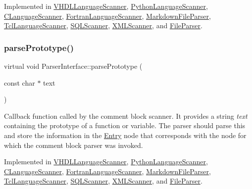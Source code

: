 Implemented in \mbox{\hyperlink{class_v_h_d_l_language_scanner_a604cae09257525fbca32c10ffeb6e961}{V\+H\+D\+L\+Language\+Scanner}}, \mbox{\hyperlink{class_python_language_scanner_a6848c585fe2a19cd36ed34540dc3fdce}{Python\+Language\+Scanner}}, \mbox{\hyperlink{class_c_language_scanner_a0a92c2f77d7b78987e8dad149a2f4171}{C\+Language\+Scanner}}, \mbox{\hyperlink{class_fortran_language_scanner_a6f2e7fa4a4d46ae48289cd135f9f495d}{Fortran\+Language\+Scanner}}, \mbox{\hyperlink{class_markdown_file_parser_a56e4994924ce8ac7710e2a1da0f98807}{Markdown\+File\+Parser}}, \mbox{\hyperlink{class_tcl_language_scanner_a0c1673d0753d4fa415de90aa7d875e0e}{Tcl\+Language\+Scanner}}, \mbox{\hyperlink{class_s_q_l_scanner_ace5de45254ddb10a6282bf626aea6994}{S\+Q\+L\+Scanner}}, \mbox{\hyperlink{class_x_m_l_scanner_ad7b6e344f24e73a8757937a806b5931a}{X\+M\+L\+Scanner}}, and \mbox{\hyperlink{class_file_parser_a129994a05caded4f7bfe5d30945f008b}{File\+Parser}}.

\mbox{\label{class_parser_interface_a5ebf0f524a296845befa22c85a4cc80b}} 
\subsubsection{\texorpdfstring{parsePrototype()}{parsePrototype()}}
{\footnotesize\ttfamily virtual void Parser\+Interface\+::parse\+Prototype (\begin{DoxyParamCaption}\item[{const char $\ast$}]{text }\end{DoxyParamCaption})\hspace{0.3cm}{\ttfamily [pure virtual]}}

Callback function called by the comment block scanner. It provides a string {\itshape text} containing the prototype of a function or variable. The parser should parse this and store the information in the \mbox{\hyperlink{class_entry}{Entry}} node that corresponds with the node for which the comment block parser was invoked. 

Implemented in \mbox{\hyperlink{class_v_h_d_l_language_scanner_a10bbe28441f011a5de49705e1a64db00}{V\+H\+D\+L\+Language\+Scanner}}, \mbox{\hyperlink{class_python_language_scanner_a114cb3ee5e45f0eb07829faa2868e31e}{Python\+Language\+Scanner}}, \mbox{\hyperlink{class_c_language_scanner_afabfbfe6ca101e1d0d02fed9d197cad1}{C\+Language\+Scanner}}, \mbox{\hyperlink{class_fortran_language_scanner_a8ae8487e02f24ee625ad804b9bda78b3}{Fortran\+Language\+Scanner}}, \mbox{\hyperlink{class_markdown_file_parser_a5579fefcfe5512e79abfe55fd508fc95}{Markdown\+File\+Parser}}, \mbox{\hyperlink{class_tcl_language_scanner_ad39889d754478f3bd641c92c3fdb2247}{Tcl\+Language\+Scanner}}, \mbox{\hyperlink{class_s_q_l_scanner_ae86c2ea0733df595918fad083095e5b1}{S\+Q\+L\+Scanner}}, \mbox{\hyperlink{class_x_m_l_scanner_afee3f3cec27ae00c00b6fcdd78476edb}{X\+M\+L\+Scanner}}, and \mbox{\hyperlink{class_file_parser_a810fbf1258dcc4d4d87711499a7f7454}{File\+Parser}}.

